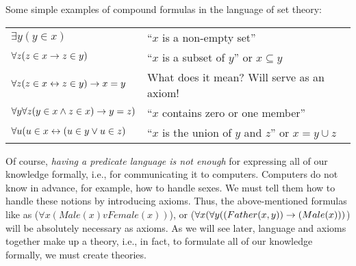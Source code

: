 \begin{ex}[]
Some simple examples of compound formulas in the language of set theory:
\begin{center}
\begin{tabular}{l l}
\(\exists y(y \in x)\)
& ``\(x\) is a non-empty set'' \\
\(\forall z (z \in x\rightarrow z \in y)\)
& ``\(x\) is a subset of \(y\)'' or \(x\subseteq y\) \\
\(\forall z (z\in x\leftrightarrow z\in y)\rightarrow x=y\)
& What does it mean? Will serve as an axiom! \\
\(\forall y\forall z(y\in x \wedge z\in x)\rightarrow y=z)\)
& ``\(x\) contains zero or one member'' \\
\(\forall u (u\in x\leftrightarrow (u\in y \vee u\in z)\)
& ``\(x\) is the union of \(y\) and \(z\)'' or \(x=y\cup z\)
\end{tabular}
\end{center}
\end{ex}

Of course, \emph{having a predicate language is not enough} for expressing all of our knowledge formally, i.e., for communicating it to computers.
Computers do not know in advance, for example, how to handle sexes.
We must tell them how to handle these notions by introducing axioms. Thus, the above-mentioned formulas like as (\(\forall x(Male(x) v Female(x))\)), or (\(\forall x(\forall y((Father(x, y))\rightarrow (Male(x)))\)) will be absolutely necessary as axioms.
As we will see later, language and axioms together make up a theory, i.e., in fact, to formulate all of our knowledge formally, we must create theories.


